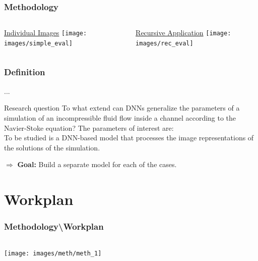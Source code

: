 \documentclass[18pt]{beamer}
\begin{document}
\begin{frame}[t]
  \frametitle{Methodology}
  \vspace{-1cm}
  \begin{columns}[t]
    \begin{column}{0.5\textwidth}
      \begin{center}
        {\large \underline{Individual Images}}
        \texttt{[image: images/simple\_eval]}
      \end{center}
    \end{column}
    \begin{column}{0.5\textwidth}
      \begin{center}
        {\large \underline{Recursive Application}}
        \texttt{[image: images/rec\_eval]}
      \end{center}
    \end{column}
  \end{columns}
\end{frame}


\begin{frame}[t]
  \frametitle{Definition}
  ...
  \begin{block}{Research question}
    To what extend can DNNs generalize the parameters of a simulation of an incompressible fluid flow inside a channel according to the Navier-Stoke equation? The parameters of interest are:
    \\
    To be studied is a DNN-based model that processes the image representations of the solutions of the simulation.
  \end{block}
  \pause
  $\Longrightarrow$ \textbf{Goal:} Build a separate model for each of the cases.
\end{frame}


\section{Workplan}
\begin{frame}[t]
  \frametitle{Methodology\textbackslash Workplan}
  \begin{columns}[t]
    \begin{column}{0.35\textwidth}
      \texttt{[image: images/meth/meth\_1]}
    \end{column}
    \begin{column}[t]{0.65\textwidth}
      \vspace*{-7cm}
    \end{column}
  \end{columns}
\end{frame}
\end{document}
